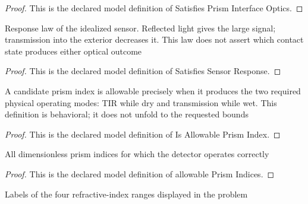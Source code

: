 \begin{proof}
  This is the declared model definition of Satisfies Prism Interface Optics.
\end{proof}
\begin{definition}
  \label{def:physics:phyx-mini-0147:phyxminiproblems-problemphyxmini0147-satisfiessensorresponse}
  Response law of the idealized sensor. Reflected light gives the large signal; transmission into the exterior decreases it. This law does not assert which contact state produces either optical outcome
\end{definition}
\begin{proof}
  This is the declared model definition of Satisfies Sensor Response.
\end{proof}
\begin{definition}
  \label{def:physics:phyx-mini-0147:phyxminiproblems-problemphyxmini0147-isallowableprismindex}
  A candidate prism index is allowable precisely when it produces the two required physical operating modes: TIR while dry and transmission while wet. This definition is behavioral; it does not unfold to the requested bounds
\end{definition}
\begin{proof}
  This is the declared model definition of Is Allowable Prism Index.
\end{proof}
\begin{definition}
  \label{def:physics:phyx-mini-0147:phyxminiproblems-problemphyxmini0147-allowableprismindices}
  All dimensionless prism indices for which the detector operates correctly
\end{definition}
\begin{proof}
  This is the declared model definition of allowable Prism Indices.
\end{proof}
\begin{definition}
  \label{def:physics:phyx-mini-0147:phyxminiproblems-problemphyxmini0147-answerchoice}
  Labels of the four refractive-index ranges displayed in the problem
\end{definition}
